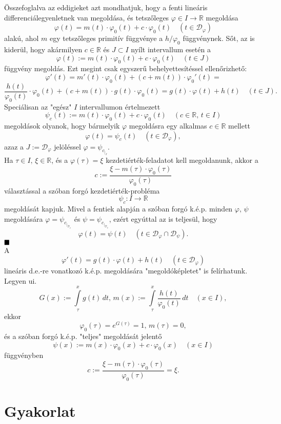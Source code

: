 \documentclass{article}
\newcommand{\R}{\mathbb{R}}
\newcommand{\Dp}{\mathcal{D}_\varphi}
\begin{document}
	Összefoglalva az eddigieket azt mondhatjuk, hogy a fenti lineáris differenciálegyenletnek van megoldása, és tetszőleges $\varphi \in I \to \R$ megoldása
	\[
		\varphi(t) = m(t) \cdot \varphi_0(t) + c \cdot \varphi_0(t) \quad (t \in \Dp)
	\]
	alakú, ahol $m$ egy tetszőleges primitív függvénye a $h / \varphi_0$ függvénynek. Sőt, az is kiderül, hogy akármilyen $c \in \R$ és $J \subset I$ nyílt intervallum esetén a
	\[
		\varphi(t) := m(t) \cdot \varphi_0(t) + c \cdot \varphi_0(t) \quad (t \in J)
	\]
	függvény megoldás. Ezt megint csak egyszerű behelyettesítéssel ellenőrizhető:
	\[
		\varphi'(t) = m'(t) \cdot \varphi_0(t) + (c + m(t)) \cdot \varphi_0'(t) =
	\]
	\[
		\frac{h(t)}{\varphi_0(t)} \cdot \varphi_0(t) + (c + m(t)) \cdot g(t) \cdot \varphi_0(t) = g(t) \cdot \varphi(t) + h(t) \quad (t \in J).
	\]
	Speciálisan az "egész" $I$ intervallumon értelmezett
	\[
		\psi_c(t) := m(t) \cdot \varphi_0(t) + c \cdot \varphi_0(t) \quad (c \in \R, \, t \in I)
	\]
	megoldások olyanok, hogy bármelyik $\varphi$ megoldásra egy alkalmas $c \in \R$ mellett
	\[
		\varphi(t) = \psi_c(t) \quad (t \in \Dp),
	\]
	azaz a $J := \Dp$ jelöléssel $\varphi = \psi_{c_{|_J}}$.\\
	
	Ha $\tau \in I, \, \xi \in \R$, és a $\varphi(\tau) = \xi$ kezdetiérték-feladatot kell megoldanunk, akkor a
	\[
		c := \frac{\xi - m(\tau) \cdot \varphi_0(\tau)}{\varphi_0(\tau)}
	\]
	választással a szóban forgó kezdetiérték-probléma
	\[
		\psi_c : I \to \R
	\]
	megoldását kapjuk. Mivel a fentiek alapján a szóban forgó k.é.p. minden $\varphi, \, \psi$ megoldására $\varphi = \psi_{c_{|_{\Dp}}}$ és $\psi = \psi_{c_{|_{\mathcal{D}_\psi}}}$, ezért egyúttal az is teljesül, hogy
	\[
		\varphi(t) = \psi(t) \quad (t \in \Dp \cap \mathcal{D}_\psi).
	\]
	$\hfill \blacksquare$\\
	
	A
	\[
		\varphi'(t) = g(t) \cdot \varphi(t) + h(t) \quad (t \in \Dp)
	\]
	lineáris d.e.-re vonatkozó k.é.p. megoldására "megoldóképletet" is felírhatunk. Legyen ui.
	\[
		G(x) := \int\limits_\tau^x g(t) \, dt, \, m(x) := \int\limits_\tau^x \frac{h(t)}{\varphi_0(t)} \, dt \quad (x \in I),
	\]
	ekkor
	\[
		\varphi_0(\tau) = e^{G(\tau)} = 1, \, m(\tau) = 0,
	\]
	és a szóban forgó k.é.p. "teljes" megoldását jelentő
	\[
		\psi(x) := m(x) \cdot \varphi_0(x) + c \cdot \varphi_0(x) \quad (x \in I)
	\]
	függvényben
	\[
		c := \frac{\xi - m(\tau) \cdot \varphi_0(\tau)}{\varphi_0(\tau)} = \xi.
	\]
	
	\newpage
	\section{Gyakorlat}
\end{document}
